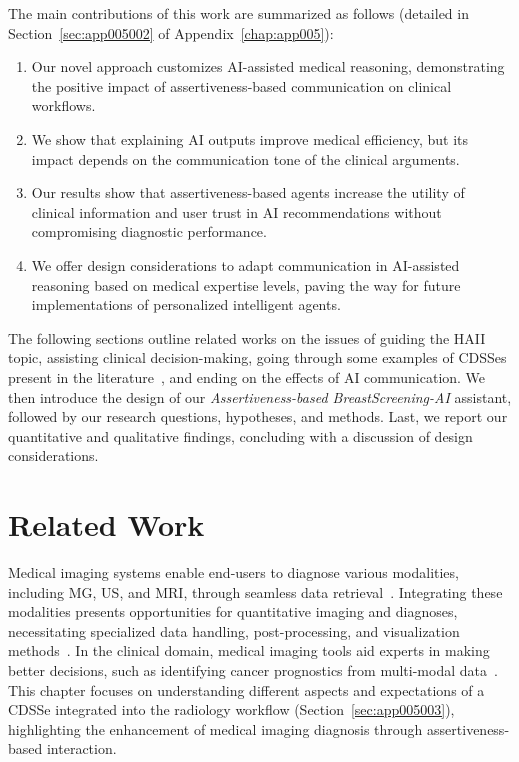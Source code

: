 \noindent
The main contributions of this work are summarized as follows (detailed in Section~\ref{sec:app005002} of Appendix~\ref{chap:app005}):

\vspace{0.05mm}

\begin{enumerate}
\item Our novel approach customizes \ac{AI}-assisted medical reasoning, demonstrating the positive impact of assertiveness-based communication on clinical workflows.
\item We show that explaining \ac{AI} outputs improve medical efficiency, but its impact depends on the communication tone of the clinical arguments.
\item Our results show that assertiveness-based agents increase the utility of clinical information and user trust in \ac{AI} recommendations without compromising diagnostic performance.
\item We offer design considerations to adapt communication in \ac{AI}-assisted reasoning based on medical expertise levels, paving the way for future implementations of personalized intelligent agents.
\end{enumerate}

\vspace{0.50mm}

The following sections outline related works on the issues of guiding the \ac{HAII} topic, assisting clinical decision-making, going through some examples of \acp{CDSSe} present in the literature~\cite{NAISEH2023102941, 10.1145/3531146.3533193}, and ending on the effects of \ac{AI} communication.
We then introduce the design of our {\it Assertiveness-based BreastScreening-AI} assistant, followed by our research questions, hypotheses, and methods.
Last, we report our quantitative and qualitative findings, concluding with a discussion of design considerations.

\section{Related Work}
\label{sec:chap006002}

Medical imaging systems enable end-users to diagnose various modalities, including \ac{MG}, \ac{US}, and \ac{MRI}, through seamless data retrieval~\cite{10.1145/3544548.3580682}.
Integrating these modalities presents opportunities for quantitative imaging and diagnoses, necessitating specialized data handling, post-processing, and visualization methods~\cite{Igarashi:2016:IVS:2984511.2984537}.
In the clinical domain, medical imaging tools aid experts in making better decisions, such as identifying cancer prognostics from multi-modal data~\cite{10.1145/3399715.3399744}.
This chapter focuses on understanding different aspects and expectations of a \ac{CDSSe} integrated into the radiology workflow (Section~\ref{sec:app005003}), highlighting the enhancement of medical imaging diagnosis through assertiveness-based interaction.

